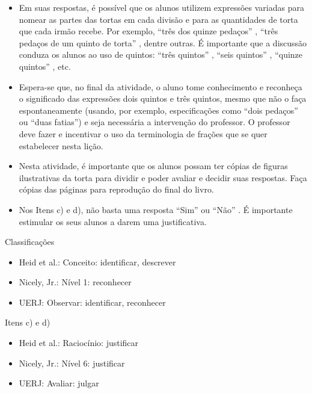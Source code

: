 \documentclass[oneside]{book}
\begin{document}
\begin{multicols}{2}
\begin{itemize} %
    \item       Em suas respostas, é possível que os alunos utilizem expressões variadas para nomear as partes das tortas em cada divisão e para as quantidades de torta que cada irmão recebe. Por exemplo,       ``três dos quinze pedaços''      ,       ``três pedaços de um quinto de torta''      , dentre outras. É importante que a discussão conduza os alunos ao uso de quintos:       ``três quintos''      ,       ``seis quintos''      ,       ``quinze quintos''      , etc.
    \item       Espera-se que, no final da atividade, o aluno tome conhecimento e reconheça o significado das expressões dois quintos e três quintos, mesmo que não o faça espontaneamente (usando, por exemplo, especificações como       ``dois pedaços''       ou       ``duas fatias'') e seja necessária a intervenção do professor. O professor deve fazer e incentivar o uso da terminologia de frações que se quer estabelecer nesta lição.
    \item       Nesta atividade, é importante que os alunos possam ter cópias de figuras ilustrativas da torta para dividir e poder avaliar e decidir suas respostas. Faça cópias das páginas para reprodução do final do livro.
    \item       Nos Itens c) e d), não basta uma resposta       ``Sim''       ou       ``Não''      . É importante estimular os seus alunos a darem uma justificativa.
\end{itemize} %



  Classificações
\begin{itemize} %
    \item       Heid et al.: Conceito: identificar, descrever
    \item       Nicely, Jr.: Nível 1: reconhecer
    \item       UERJ: Observar: identificar, reconhecer
\end{itemize} %

  Itens c) e d)
\begin{itemize} %
    \item       Heid et al.: Raciocínio: justificar
    \item       Nicely, Jr.: Nível 6: justificar
    \item       UERJ: Avaliar: julgar
\end{itemize} %


\end{multicols}
\end{document}
